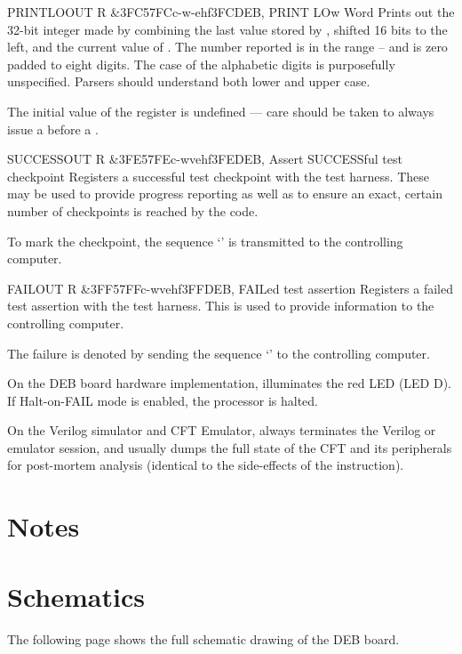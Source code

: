 \begin{extcmd}{PRINTLO}{OUT R \&3FC}{57FC}{c-w-ehf}{3FC}{DEB, PRINT LOw Word}
  Prints out the 32-bit integer made by combining the last value stored
  by , shifted 16 bits to the left, and the current value
  of \A{}. The number reported is in the range
  – and is zero padded to eight digits. The
  case of the alphabetic digits is purposefully unspecified. Parsers
  should understand both lower and upper case.

  The initial value of the  register is undefined — care
  should be taken to always issue a  before a
  .
\end{extcmd}

\begin{extcmd}{SUCCESS}{OUT R \&3FE}{57FE}{c-wvehf}{3FE}{DEB, Assert SUCCESSful test checkpoint}
  Registers a successful test checkpoint with the test harness. These
  may be used to provide progress reporting as well as to ensure an
  exact, certain number of checkpoints is reached by the code.

  To mark the checkpoint, the sequence ‘\cftout{[ok]}’ is transmitted to
  the controlling computer.
\end{extcmd}

\begin{extcmd}{FAIL}{OUT R \&3FF}{57FF}{c-wvehf}{3FF}{DEB, FAILed test assertion}
  Registers a failed test assertion with the test harness. This
  is used to provide information to the controlling computer.

  The failure is denoted by sending the sequence ‘\cftout{[fail]}’ to the
  controlling computer.

  On the \gls{DEB} board hardware implementation,  illuminates
  the red LED (LED D). If Halt-on-FAIL mode is enabled, the processor is halted.

  On the Verilog simulator and CFT Emulator,  always
  terminates the Verilog or emulator session, and usually dumps the full
  state of the CFT and its peripherals for post-mortem analysis
  (identical to the side-effects of the  instruction).
\end{extcmd}


\section{Notes}



\section{Schematics}

The following page shows the full schematic drawing of the \gls{DEB} board.

